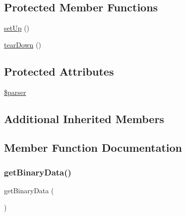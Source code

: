 \subsection*{Protected Member Functions}
\begin{DoxyCompactItemize}
\item 
\mbox{\hyperlink{class_symfony_1_1_component_1_1_yaml_1_1_tests_1_1_parser_test_a0bc688732d2b3b162ffebaf7812e78da}{set\+Up}} ()
\item 
\mbox{\hyperlink{class_symfony_1_1_component_1_1_yaml_1_1_tests_1_1_parser_test_a80fe3d17e658907fc75346a0ec9d6fc7}{tear\+Down}} ()
\end{DoxyCompactItemize}
\subsection*{Protected Attributes}
\begin{DoxyCompactItemize}
\item 
\mbox{\hyperlink{class_symfony_1_1_component_1_1_yaml_1_1_tests_1_1_parser_test_a147a766daa03d52576c7345fea31c945}{\$parser}}
\end{DoxyCompactItemize}
\subsection*{Additional Inherited Members}


\subsection{Member Function Documentation}
\mbox{\label{class_symfony_1_1_component_1_1_yaml_1_1_tests_1_1_parser_test_afb7f946c9c44d742389e7519763dd22e}} 
\subsubsection{\texorpdfstring{get\+Binary\+Data()}{getBinaryData()}}
{\footnotesize\ttfamily get\+Binary\+Data (\begin{DoxyParamCaption}{ }\end{DoxyParamCaption})}

